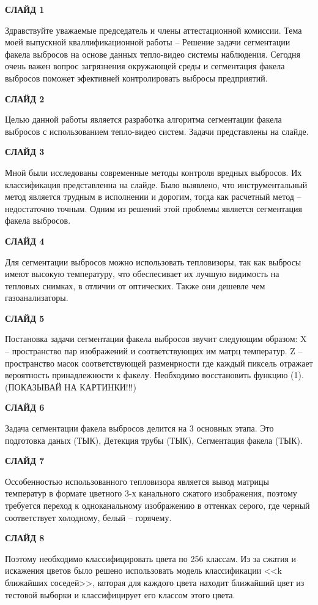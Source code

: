 \documentclass[14pt, a4paper]{extreport}
\begin{document}
	\textbf{СЛАЙД 1}
	
	Здравствуйте уважаемые председатель и члены аттестационной комиссии. Тема моей выпускной кваллификационной работы -- Решение задачи сегментации
	факела выбросов на основе данных тепло-видео системы наблюдения. Сегодня очень важен вопрос загрязнения окружающей среды и сегментация факела выбросов поможет эфективней контролировать выбросы предприятий.
	
	\textbf{СЛАЙД 2}
	
	Целью данной работы является разработка алгоритма сегментации факела выбросов с использованием тепло-видео систем. Задачи представлены на слайде.
	
	\textbf{СЛАЙД 3}
	
	Мной были исследованы современные методы контроля вредных выбросов. Их классификация представленна на слайде. Было выявлено, что инструментальный метод является трудным в исполнении и дорогим, тогда как расчетный метод -- недостаточно точным. Одним из решений этой проблемы является сегментация факела выбросов.
	
	\textbf{СЛАЙД 4}
	
	Для сегментации выбросов можно использовать тепловизоры, так как выбросы имеют высокую температуру, что обеспесивает их лучшую видимость на тепловых снимках, в отличии от оптических. Также они дешевле чем газоанализаторы. 
	
	\textbf{СЛАЙД 5}
	
	Постановка задачи сегментации факела выбросов звучит следующим образом: X -- пространство пар изображений и соответствующих им матрц температур. Z -- пространство масок соответствующей разменрности где каждый пиксель отражает вероятность принадлежности к факелу. Необходимо восстановить функцию (1). (ПОКАЗЫВАЙ НА КАРТИНКИ!!!)
	
	\textbf{СЛАЙД 6}
	
	Задача сегментации факела выбросов делится на 3 основных этапа. Это подготовка даных (ТЫК), Детекция трубы (ТЫК), Сегментация факела (ТЫК).
	
	\textbf{СЛАЙД 7}
	
	Оссобенностью использованного тепловизора является вывод матрицы температур в формате цветного 3-х канального  сжатого изображения, поэтому требуется переход к одноканальному изображению в оттенках серого, где черный соответствует холодному, белый -- горячему.
	
	\textbf{СЛАЙД 8}
	
	Поэтому необходимо классифицировать цвета по 256 классам. Из за сжатия и искажения цветов было решено использовать модель классификации <<k ближайших соседей>>, которая для каждого цвета находит ближайший цвет из тестовой выборки и классифицирует его классом этого цвета.
	
\end{document}

